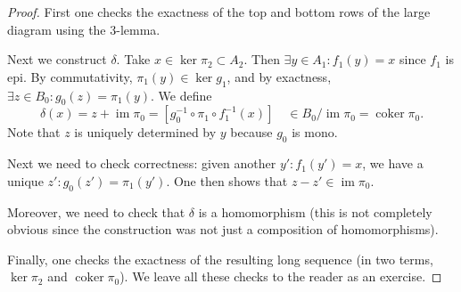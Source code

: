 \documentclass[english,letterpaper]{article}%
\numberwithin{equation}{section}
\numberwithin{figure}{section}
\numberwithin{table}{section}
\theoremstyle{definition}
\theoremstyle{definition}
\theoremstyle{definition}
\theoremstyle{plain}
\theoremstyle{plain}
\theoremstyle{plain}
\theoremstyle{plain}
\theoremstyle{remark}
\theoremstyle{remark}
\DeclareMathOperator{\im}{im}
\DeclareMathOperator{\coker}{coker}
\begin{document}
\begin{lem}
\end{lem}
\begin{proof}
    First one checks the exactness of the top and bottom rows of the large diagram using the 3-lemma.
    
    Next we construct $\delta$. Take $x\in \ker\pi_2\subset A_2$. Then $\exists y\in A_1:f_1(y)=x$ since $f_1$ is epi. By commutativity, $\pi_1(y)\in\ker g_1$, and by exactness, $\exists z\in B_0:g_0(z)=\pi_1(y)$. We define
    \[\delta(x)=z+\im \pi_0=[g_0^{-1}\circ\pi_1\circ f_1^{-1}(x)]\quad \in B_0/\im\pi_0=\coker\pi_0.\]
    Note that $z$ is uniquely determined by $y$ because $g_0$ is mono.
    
    Next we need to check correctness: given another $y': f_1(y')=x$, we have a unique $z':g_0(z')=\pi_1(y')$. One then shows that $z-z'\in \im\pi_0$.
    
    Moreover, we need to check that $\delta$ is a homomorphism (this is not completely obvious since the construction was not just a composition of homomorphisms).
    
    Finally, one checks the exactness of the resulting long sequence (in two terms, $\ker\pi_2$ and $\coker\pi_0$). We leave all these checks to the reader as an exercise.
\end{proof}
\end{document}
